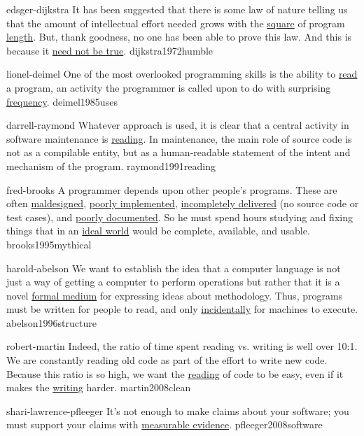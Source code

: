 \documentclass{article}
\begin{document}


\qte
  {edsger-dijkstra}
  {It has been suggested that there is some law of nature telling us that the amount of intellectual effort needed grows with the \ul{square} of program \ul{length}. But, thank goodness, no one has been able to prove this law. And this is because it \ul{need not be true}.}
  {dijkstra1972humble}

\qte
  {lionel-deimel}
  {One of the most overlooked programming skills is the ability to \ul{read} a program, an activity the programmer is called upon to do with surprising \ul{frequency}.}
  {deimel1985uses}

\qte
  {darrell-raymond}
  {Whatever approach is used, it is clear that a central activity in software maintenance is \ul{reading}. In maintenance, the main role of source code is not as a compilable entity, but as a human-readable statement of the intent and mechanism of the program.}
  {raymond1991reading}

\qte
  {fred-brooks}
  {A programmer depends upon other people's programs. These are often \ul{maldesigned}, \ul{poorly implemented}, \ul{incompletely delivered} (no source code or test cases), and \ul{poorly documented}. So he must spend hours studying and fixing things that in an \ul{ideal world} would be complete, available, and usable.}
  {brooks1995mythical}

\qte
  {harold-abelson}
  {We want to establish the idea that a computer language is not just a way of getting a computer to perform operations but rather that it is a novel \ul{formal medium} for expressing ideas about methodology. Thus, programs must be written for people to read, and only \ul{incidentally} for machines to execute.}
  {abelson1996structure}

\qte
  {robert-martin}
  {Indeed, the ratio of time spent reading vs. writing is well over 10:1. We are constantly reading old code as part of the effort to write new code. Because this ratio is so high, we want the \ul{reading} of code to be easy, even if it makes the \ul{writing} harder.}
  {martin2008clean}


\qte
  {shari-lawrence-pfleeger}
  {It's not enough to make claims about your software; you must support your claims with \ul{measurable evidence}.}
  {pfleeger2008software}
\end{document}
